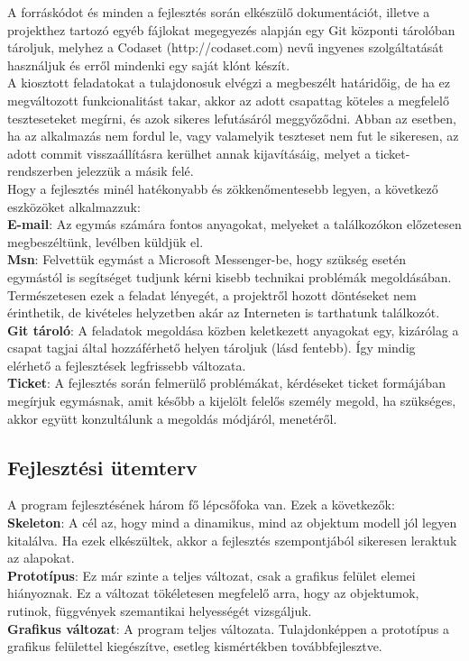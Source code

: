 A forráskódot és minden a fejlesztés során elkészülő dokumentációt, illetve a projekthez tartozó egyéb fájlokat megegyezés alapján egy Git központi tárolóban tároljuk, melyhez a Codaset (http://codaset.com) nevű ingyenes szolgáltatását használjuk és erről mindenki egy saját klónt készít.\\

A kiosztott feladatokat a tulajdonosuk elvégzi a megbeszélt határidőig, de ha ez megváltozott funkcionalitást takar, akkor az adott csapattag köteles a megfelelő teszteseteket megírni, és azok sikeres lefutásáról meggyőződni. Abban az esetben, ha az alkalmazás nem fordul le, vagy valamelyik teszteset nem fut le sikeresen, az adott commit visszaállításra kerülhet annak kijavításáig, melyet a ticket-rendszerben jelezzük a másik felé.\\

Hogy a fejlesztés minél hatékonyabb és zökkenőmentesebb legyen, a következő eszközöket alkalmazzuk:\\
\textbf{E-mail}: Az egymás számára fontos anyagokat, melyeket a találkozókon előzetesen megbeszéltünk, levélben küldjük el.\\
\textbf{Msn}: Felvettük egymást a Microsoft Messenger-be, hogy szükség esetén egymástól is segítséget tudjunk kérni kisebb technikai problémák megoldásában. Természetesen ezek a feladat lényegét, a projektről hozott döntéseket nem érinthetik, de kivételes helyzetben akár az Interneten is tarthatunk találkozót.\\
\textbf{Git tároló}: A feladatok megoldása közben keletkezett anyagokat egy, kizárólag a csapat tagjai által hozzáférhető helyen tároljuk (lásd fentebb). Így mindig elérhető a fejlesztések legfrissebb változata.\\
\textbf{Ticket}: A fejlesztés során felmerülő problémákat, kérdéseket ticket formájában megírjuk egymásnak, amit később a kijelölt felelős személy megold, ha szükséges, akkor együtt konzultálunk a megoldás módjáról, menetéről.

\subsection{Fejlesztési ütemterv}

A program fejlesztésének három fő lépcsőfoka van. Ezek a következők:\\
\textbf{Skeleton}: A cél az, hogy mind a dinamikus, mind az objektum modell jól legyen kitalálva. Ha ezek elkészültek, akkor a fejlesztés szempontjából sikeresen leraktuk az alapokat.\\
\textbf{Prototípus}: Ez már szinte a teljes változat, csak a grafikus felület elemei hiányoznak. Ez a változat tökéletesen megfelelő arra, hogy az objektumok, rutinok, függvények szemantikai helyességét vizsgáljuk.\\
\textbf{Grafikus változat}: A program teljes változata. Tulajdonképpen a prototípus a grafikus felülettel kiegészítve, esetleg kismértékben továbbfejlesztve.

